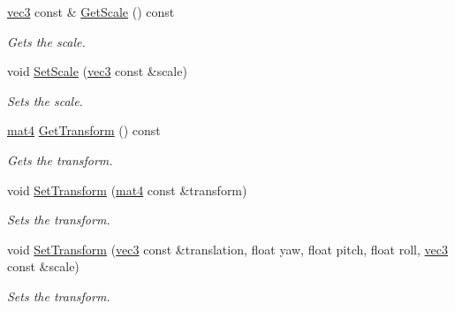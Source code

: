 \begin{DoxyCompactItemize}
\hyperlink{_types_8h_a3d0ce73e3199de81565fb01632415288}{vec3} const \& \hyperlink{class_affine_transformable_a8a9e32647f5e4bfb893d63ff8fb9b9f8}{Get\+Scale} () const 
\begin{DoxyCompactList}\small\item\em Gets the scale. \end{DoxyCompactList}\item 
void \hyperlink{class_affine_transformable_a215383be79781d61103dfdf8c201be22}{Set\+Scale} (\hyperlink{_types_8h_a3d0ce73e3199de81565fb01632415288}{vec3} const \&scale)
\begin{DoxyCompactList}\small\item\em Sets the scale. \end{DoxyCompactList}\item 
\hyperlink{_types_8h_a2db59f395fe82a7394c6324956c265d8}{mat4} \hyperlink{class_affine_transformable_a3eb990ab0b75ad30d3bb667e437d8606}{Get\+Transform} () const 
\begin{DoxyCompactList}\small\item\em Gets the transform. \end{DoxyCompactList}\item 
void \hyperlink{class_affine_transformable_aacc67804c045aa75da888ca3ea409939}{Set\+Transform} (\hyperlink{_types_8h_a2db59f395fe82a7394c6324956c265d8}{mat4} const \&transform)
\begin{DoxyCompactList}\small\item\em Sets the transform. \end{DoxyCompactList}\item 
void \hyperlink{class_affine_transformable_ac4faa6d4c8127e61622ae265ba708276}{Set\+Transform} (\hyperlink{_types_8h_a3d0ce73e3199de81565fb01632415288}{vec3} const \&translation, float yaw, float pitch, float roll, \hyperlink{_types_8h_a3d0ce73e3199de81565fb01632415288}{vec3} const \&scale)
\begin{DoxyCompactList}\small\item\em Sets the transform. \end{DoxyCompactList}\end{DoxyCompactItemize}
